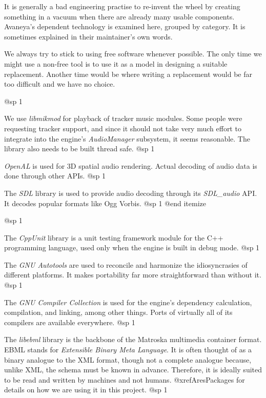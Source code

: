 It is generally a bad engineering practise to re-invent the wheel by creating something in a vacuum when there are already many usable components. Avaneya's dependent technology is examined here, grouped by category. It is sometimes explained in their maintainer's own words.

We always try to stick to using free software whenever possible. The only time we might use a non-free tool is to use it as a model in designing a suitable replacement. Another time would be where writing a replacement would be far too difficult and we have no choice.

@sp 1

\itemize
\item
We use {\sl libmikmod} for playback of tracker music modules. Some people were requesting tracker support, and since it should not take very much effort to integrate into the engine's {\sl AudioManager} subsystem, it seems reasonable. The library also needs to be built thread safe.
@sp 1

\item
{\sl OpenAL} is used for 3D spatial audio rendering. Actual decoding of audio data is done through other APIs.
@sp 1

\item
The {\sl SDL} library is used to provide audio decoding through its {\sl SDL_audio} API. It decodes popular formats like Ogg Vorbis.
@sp 1
@end itemize

@sp 1

\itemize
\item
The {\sl CppUnit} library is a unit testing framework module for the C++ programming language, used only when the engine is built in debug mode.
@sp 1

\item
The {\sl GNU Autotools} are used to reconcile and harmonize the idiosyncrasies of different platforms. It makes portability far more straightforward than without it.
@sp 1

\item
The {\sl GNU Compiler Collection} is used for the engine's dependency calculation, compilation, and linking, among other things. Ports of virtually all of its compilers are available everywhere.
@sp 1

\item
The {\sl libebml} library is the backbone of the Matroska multimedia container format. EBML stands for {\sl Extensible Binary Meta Language}. It is often thought of as a binary analogue to the XML format, though not a complete analogue because, unlike XML, the schema must be known in advance. Therefore, it is ideally suited to be read and written by machines and not humans. @xref{AresPackages} for details on how we are using it in this project.
@sp 1

